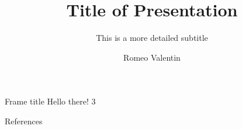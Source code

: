 \documentclass[aspectratio=169]{beamer}
\title{Title of Presentation}
\subtitle{This is a more detailed subtitle}
\author{Romeo Valentin}
\institute{Stanford University}
\date{}
\begin{document}
\begin{frame}
    \maketitle
\end{frame}

\begin{frame}{Frame title}
Hello there! 3
\end{frame}


\begin{frame}{References}
    \printbibliography
\end{frame}
\end{document}

